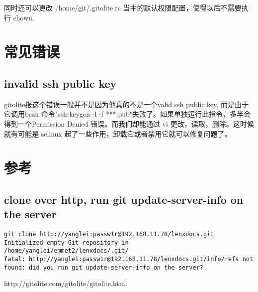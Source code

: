\documentclass[a4paper,11pt,twoside,openany]{article}
\begin{document}
同时还可以更改 /home/git/.gitolite.rc 当中的默认权限配置，使得以后不需要执行 chown.

\section{常见错误}
\subsection{invalid ssh public key}
gitolite报这个错误一般并不是因为他真的不是一个valid ssh public key, 而是由于它调用bash 命令"ssh-keygen -l -f ***.pub"失败了。如果单独运行此指令，多半会得到一个Permission Denied 错误。而我们却能通过 vi 更改，读取，删除。这时候就有可能是 selinux 起了一些作用，卸载它或者禁用它就可以修复问题了。
\section{参考}
\subsection{clone over http, run git update-server-info on the server}
\begin{lstlisting}
git clone http://yanglei:passw1r@192.168.11.78/lenxdocs.git
Initialized empty Git repository in /home/yanglei/emmet2/lenxdocs/.git/
fatal: http://yanglei:passw1r@192.168.11.78/lenxdocs.git/info/refs not found: did you run git update-server-info on the server?
\end{lstlisting}
\begin{compactenum}
\item http://gitolite.com/gitolite/gitolite.html
\end{compactenum}
\end{document}

